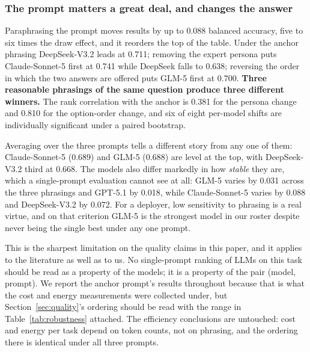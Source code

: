 \documentclass[computers,article,submit,moreauthors]{Definitions/mdpi}
\begin{document}
\subsubsection*{The prompt matters a great deal, and changes the answer}
Paraphrasing the prompt moves results by up to $0.088$ balanced accuracy, five to six times the draw effect, and it reorders the top of the table. Under the anchor phrasing DeepSeek-V3.2 leads at 0.711; removing the expert persona puts Claude-Sonnet-5 first at 0.741 while DeepSeek falls to 0.638; reversing the order in which the two answers are offered puts GLM-5 first at 0.700. \textbf{Three reasonable phrasings of the same question produce three different winners.} The rank correlation with the anchor is 0.381 for the persona change and 0.810 for the option-order change, and six of eight per-model shifts are individually significant under a paired bootstrap.

Averaging over the three prompts tells a different story from any one of them: Claude-Sonnet-5 (0.689) and GLM-5 (0.688) are level at the top, with DeepSeek-V3.2 third at 0.668. The models also differ markedly in how \emph{stable} they are, which a single-prompt evaluation cannot see at all: GLM-5 varies by 0.031 across the three phrasings and GPT-5.1 by 0.018, while Claude-Sonnet-5 varies by 0.088 and DeepSeek-V3.2 by 0.072. For a deployer, low sensitivity to phrasing is a real virtue, and on that criterion GLM-5 is the strongest model in our roster despite never being the single best under any one prompt.

This is the sharpest limitation on the quality claims in this paper, and it applies to the literature as well as to us. No single-prompt ranking of LLMs on this task should be read as a property of the models; it is a property of the pair (model, prompt). We report the anchor prompt's results throughout because that is what the cost and energy measurements were collected under, but Section~\ref{sec:quality}'s ordering should be read with the range in Table~\ref{tab:robustness} attached. The efficiency conclusions are untouched: cost and energy per task depend on token counts, not on phrasing, and the ordering there is identical under all three prompts.
\end{document}
